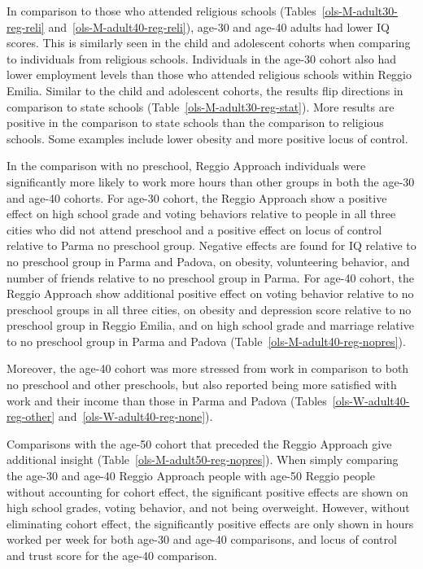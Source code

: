 In comparison to those who attended religious schools (Tables~\ref{ols-M-adult30-reg-reli} and~\ref{ols-M-adult40-reg-reli}), age-30 and age-40 adults had lower IQ scores. This is similarly seen in the child and adolescent cohorts when comparing to individuals from religious schools. Individuals in the age-30 cohort also had lower employment levels than those who attended religious schools within Reggio Emilia. Similar to the child and adolescent cohorts, the results flip directions in comparison to state schools (Table~\ref{ols-M-adult30-reg-stat}). More results are positive in the comparison to state schools than the comparison to religious schools. Some examples include lower obesity and more positive locus of control.

In the comparison with no preschool, Reggio Approach individuals were significantly more likely to work more hours than other groups in both the age-30 and age-40 cohorts. For age-30 cohort, the Reggio Approach show a positive effect on high school grade and voting behaviors relative to people in all three cities who did not attend preschool and a positive effect on locus of control relative to Parma no preschool group. Negative effects are found for IQ relative to no preschool group in Parma and Padova, on obesity, volunteering behavior, and number of friends relative to no preschool group in Parma. For age-40 cohort, the Reggio Approach show additional positive effect on voting behavior relative to no preschool groups in all three cities, on obesity and depression score relative to no preschool group in Reggio Emilia, and on high school grade and marriage relative to no preschool group in Parma and Padova (Table~\ref{ols-M-adult40-reg-nopres}).

Moreover, the age-40 cohort was more stressed from work in comparison to both no preschool and other preschools, but also reported being more satisfied with work and their income than those in Parma and Padova (Tables~\ref{ols-W-adult40-reg-other} and~\ref{ols-W-adult40-reg-none}).

Comparisons with the age-50 cohort that preceded the Reggio Approach give additional insight (Table~\ref{ols-M-adult50-reg-nopres}). When simply comparing the age-30 and age-40 Reggio Approach people with age-50 Reggio people without accounting for cohort effect, the significant positive effects are shown on high school grades, voting behavior, and not being overweight. However, without eliminating cohort effect, the significantly positive effects are only shown in hours worked per week for both age-30 and age-40 comparisons, and locus of control and trust score for the age-40 comparison.
 
